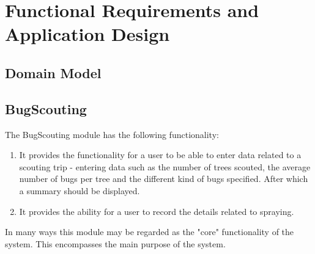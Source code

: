 \documentclass[11pt,a4paper,titlepage]{article}
\begin{document}
\section{Functional Requirements and Application Design}
	\subsection{Domain Model}
	

	\subsection{BugScouting}
		The BugScouting module has the following functionality:
		\begin{enumerate}
			\item It provides the functionality for a user to be able to enter data related to a scouting trip - entering data such as the number of trees scouted, the average number of bugs per tree and the different kind of bugs specified. After which a summary should be displayed.
			\item It provides the ability for a user to record the details related to spraying.
		\end{enumerate}

		In many ways this module may be regarded as the "core" functionality of the system. This encompasses the main purpose of the system.
\end{document}
